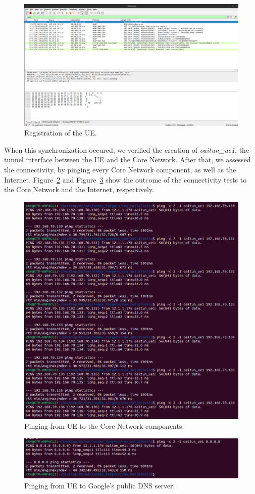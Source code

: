 \begin{figure}[H]
    \centering
    \includegraphics[width=0.8\linewidth]{figures/ue_registration}
    \caption{Registration of the UE.}
    \label{fig:registration_ue}
\end{figure}

When this synchronization occured, we verified the creation of \textit{oaitun\_ue1}, the tunnel interface between the UE and the Core Network.
After that, we assessed the connectivity, by pinging every Core Network component, as well as the Internet.
Figure~\ref{fig:ping_ue_core} and Figure~\ref{fig:ping_ue_internet} show the outcome of the connectivity tests to the Core Network and the Internet, respectively.

\begin{figure}[H]
    \centering
    \includegraphics[width=0.5\linewidth]{figures/ue_core_ping}
    \caption{Pinging from UE to the Core Network components.}
    \label{fig:ping_ue_core}
\end{figure}

\begin{figure}[H]
    \centering
    \includegraphics[width=0.5\linewidth]{figures/ue_to_ext}
    \caption{Pinging from UE to Google's public DNS server.}
    \label{fig:ping_ue_internet}
\end{figure}


